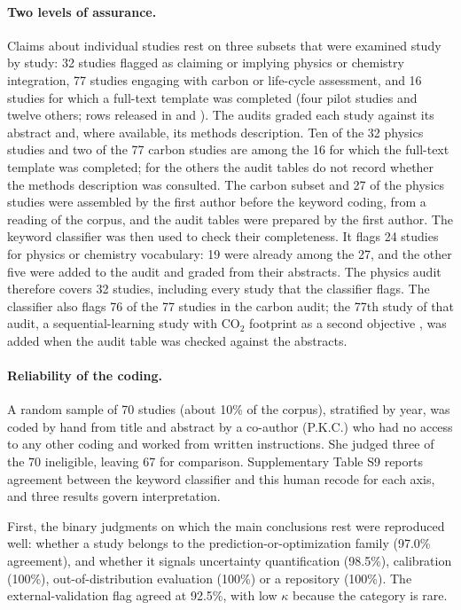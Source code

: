 \documentclass[pdflatex,sn-basic]{sn-jnl}
\newcommand{\fn}[1]{\texttt{\detokenize{#1}}}
\begin{document}
\paragraph{Two levels of assurance.} Claims about individual studies rest on three subsets that were examined study by study: 32 studies flagged as claiming or implying physics or chemistry integration, 77 studies engaging with carbon or life-cycle assessment, and 16 studies for which a full-text template was completed (four pilot studies and twelve others; rows released in \fn{extraction_deep.csv} and \fn{extraction_pilot.csv}). The audits graded each study against its abstract and, where available, its methods description. Ten of the 32 physics studies and two of the 77 carbon studies are among the 16 for which the full-text template was completed; for the others the audit tables do not record whether the methods description was consulted. The carbon subset and 27 of the physics studies were assembled by the first author before the keyword coding, from a reading of the corpus, and the audit tables were prepared by the first author. The keyword classifier was then used to check their completeness. It flags 24 studies for physics or chemistry vocabulary: 19 were already among the 27, and the other five were added to the audit and graded from their abstracts. The physics audit therefore covers 32 studies, including every study that the classifier flags. The classifier also flags 76 of the 77 studies in the carbon audit; the 77th study of that audit, a sequential-learning study with CO$_2$ footprint as a second objective \citep{volker2023}, was added when the audit table was checked against the abstracts.

\paragraph{Reliability of the coding.} A random sample of 70 studies (about 10\% of the corpus), stratified by year, was coded by hand from title and abstract by a co-author (P.K.C.) who had no access to any other coding and worked from written instructions. She judged three of the 70 ineligible, leaving 67 for comparison. Supplementary Table S9 reports agreement between the keyword classifier and this human recode for each axis, and three results govern interpretation.

First, the binary judgments on which the main conclusions rest were reproduced well: whether a study belongs to the prediction-or-optimization family (97.0\% agreement), and whether it signals uncertainty quantification (98.5\%), calibration (100\%), out-of-distribution evaluation (100\%) or a repository (100\%). The external-validation flag agreed at 92.5\%, with low $\kappa$ because the category is rare.
\end{document}
